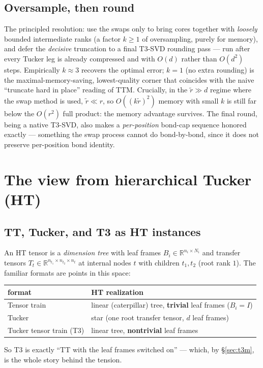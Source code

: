 \documentclass[11pt]{article}
\newcommand{\R}{\mathbb{R}}
\newcommand{\rtil}{\tilde{r}}
\begin{document}
\subsection{Oversample, then round}
The principled resolution: use the swaps only to bring cores together with
\emph{loosely} bounded intermediate ranks (a factor $k\ge1$ of oversampling,
purely for memory), and defer the \emph{decisive} truncation to a final
T3-SVD rounding pass --- run after every Tucker leg is already compressed and with
$O(d)$ rather than $O(d^2)$ steps. Empirically $k\!\approx\!3$ recovers the optimal
error; $k\!=\!1$ (no extra rounding) is the maximal-memory-saving, lowest-quality
corner that coincides with the naive ``truncate hard in place'' reading of TTM.
Crucially, in the $\rtil\gg d$ regime where the swap method is used, $\rtil\ll r$, so
$O((k\rtil)^2)$ memory with small $k$ is still far below the $O(r^2)$ full product:
the memory advantage survives. The final round, being a native T3-SVD, also makes
a \emph{per-position} bond-cap sequence honored exactly --- something the swap
process cannot do bond-by-bond, since it does not preserve per-position bond
identity.

\section{The view from hierarchical Tucker (HT)}
\label{sec:ht}

\subsection{TT, Tucker, and T3 as HT instances}
An HT tensor is a \emph{dimension tree} with leaf frames $B_i\in\R^{n_i\times N_i}$
and transfer tensors $T_t\in\R^{n_{t_1}\times n_{t_2}\times n_t}$ at internal nodes
$t$ with children $t_1,t_2$ (root rank $1$). The familiar formats are points in
this space:
\begin{center}
\begin{tabular}{ll}
\toprule
format & HT realization\\
\midrule
Tensor train & linear (caterpillar) tree, \textbf{trivial} leaf frames ($B_i=I$)\\
Tucker & star (one root transfer tensor, $d$ leaf frames)\\
Tucker tensor train (T3) & linear tree, \textbf{nontrivial} leaf frames\\
\bottomrule
\end{tabular}
\end{center}
So T3 is exactly ``TT with the leaf frames switched on'' --- which, by
\S\ref{sec:t3m}, is the whole story behind the tension.
\end{document}
